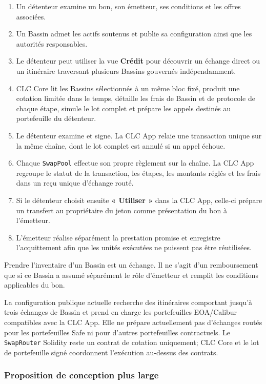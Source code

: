 \documentclass[11pt]{article}
\begin{document}
\begin{enumerate}[leftmargin=*]
\item Un détenteur examine un bon, son émetteur, ses conditions et les offres associées.
\item Un Bassin admet les actifs soutenus et publie sa configuration ainsi que les autorités responsables.
\item Le détenteur peut utiliser la vue \textbf{Crédit} pour découvrir un échange direct ou un itinéraire traversant plusieurs Bassins gouvernés indépendamment.
\item CLC Core lit les Bassins sélectionnés à un même bloc fixé, produit une cotation limitée dans le temps, détaille les frais de Bassin et de protocole de chaque étape, simule le lot complet et prépare les appels destinés au portefeuille du détenteur.
\item Le détenteur examine et signe. La CLC App relaie une transaction unique sur la même chaîne, dont le lot complet est annulé si un appel échoue.
\item Chaque \texttt{SwapPool} effectue son propre règlement sur la chaîne. La CLC App regroupe le statut de la transaction, les étapes, les montants réglés et les frais dans un reçu unique d'échange routé.
\item Si le détenteur choisit ensuite \textbf{« Utiliser »} dans la CLC App, celle-ci prépare un transfert au propriétaire du jeton comme présentation du bon à l'émetteur.
\item L'émetteur réalise séparément la prestation promise et enregistre l'acquittement afin que les unités exécutées ne puissent pas être réutilisées.
\end{enumerate}
Prendre l'inventaire d'un Bassin est un échange. Il ne s'agit d'un remboursement que si ce Bassin a assumé séparément le rôle d'émetteur et remplit les conditions applicables du bon.

La configuration publique actuelle recherche des itinéraires comportant jusqu'à trois échanges de Bassin et prend en charge les portefeuilles EOA/Calibur compatibles avec la CLC App. Elle ne prépare actuellement pas d'échanges routés pour les portefeuilles Safe ni pour d'autres portefeuilles contractuels. Le \texttt{SwapRouter} Solidity reste un contrat de cotation uniquement; CLC Core et le lot de portefeuille signé coordonnent l'exécution au-dessus des contrats.

\subsubsection*{Proposition de conception plus large}
\end{document}

